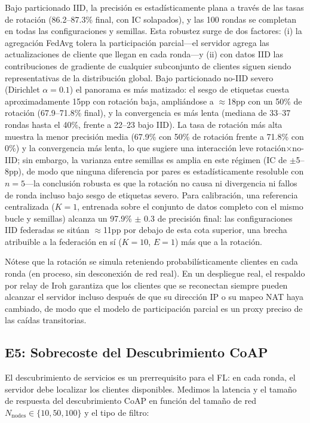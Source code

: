 \documentclass[journal]{IEEEtran}
\begin{document}
Bajo particionado IID, la precisión es estadísticamente plana a través de las tasas de rotación (86.2--87.3\% final, con IC solapados), y las 100 rondas se completan en todas las configuraciones y semillas. Esta robustez surge de dos factores: (i) la agregación FedAvg tolera la participación parcial---el servidor agrega las actualizaciones de cliente que llegan en cada ronda---y (ii) con datos IID las contribuciones de gradiente de cualquier subconjunto de clientes siguen siendo representativas de la distribución global. Bajo particionado no-IID severo (Dirichlet $\alpha{=}0.1$) el panorama es más matizado: el sesgo de etiquetas cuesta aproximadamente 15pp con rotación baja, ampliándose a $\approx$18pp con un 50\% de rotación (67.9--71.8\% final), y la convergencia es más lenta (mediana de 33--37 rondas hasta el 40\%, frente a 22--23 bajo IID). La tasa de rotación más alta muestra la menor precisión media (67.9\% con 50\% de rotación frente a 71.8\% con 0\%) y la convergencia más lenta, lo que sugiere una interacción leve rotación$\times$no-IID; sin embargo, la varianza entre semillas es amplia en este régimen (IC de $\pm$5--8pp), de modo que ninguna diferencia por pares es estadísticamente resoluble con $n{=}5$---la conclusión robusta es que la rotación no causa ni divergencia ni fallos de ronda incluso bajo sesgo de etiquetas severo. Para calibración, una referencia centralizada ($K{=}1$, entrenada sobre el conjunto de datos completo con el mismo bucle y semillas) alcanza un 97.9\% $\pm$ 0.3 de precisión final: las configuraciones IID federadas se sitúan $\approx$11pp por debajo de esta cota superior, una brecha atribuible a la federación en sí ($K{=}10$, $E{=}1$) más que a la rotación.

Nótese que la rotación se simula reteniendo probabilísticamente clientes en cada ronda (en proceso, sin desconexión de red real). En un despliegue real, el respaldo por relay de Iroh garantiza que los clientes que se reconectan siempre pueden alcanzar el servidor incluso después de que su dirección IP o su mapeo NAT haya cambiado, de modo que el modelo de participación parcial es un proxy preciso de las caídas transitorias.

\subsection{E5: Sobrecoste del Descubrimiento CoAP}
\label{sec:e5}

El descubrimiento de servicios es un prerrequisito para el FL: en cada ronda, el servidor debe localizar los clientes disponibles. Medimos la latencia y el tamaño de respuesta del descubrimiento CoAP en función del tamaño de red $N_{\text{nodes}} \in \{10, 50, 100\}$ y el tipo de filtro:
\end{document}
